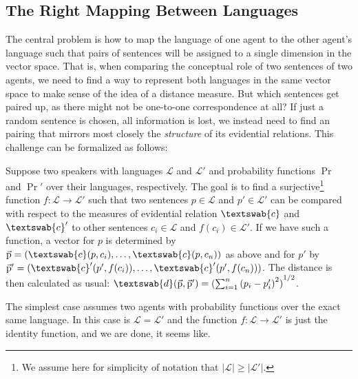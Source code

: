 \documentclass[11pt, a4paper]{scrartcl}
\renewcommand{\i}[1]{\emph{#1}}
\renewcommand{\L}{\mathcal{L}}
\renewcommand{\v}[1]{\vec{\mathrm{#1}}}
\newcommand{\m}[1]{\textswab{#1}}
\begin{document}
\subsection{The Right Mapping Between Languages}

The central problem is how to map the language of one agent to the other agent's language such that pairs of sentences will be assigned to a single dimension in the vector space. That is, when comparing the conceptual role of two sentences of two agents, we need to find a way to represent both languages in the same vector space to make sense of the idea of a distance measure. But which sentences get paired up, as there might not be one-to-one correspondence at all? If just a random sentence is chosen, all information is lost, we instead need to find an pairing that mirrors most closely the \i{structure} of its evidential relations. This challenge can be formalized as follows:

Suppose two speakers with languages $\L$ and $\L'$ and probability functions $\Pr$ and $\Pr'$ over their languages, respectively. The goal is to find a surjective\footnote{We assume here for simplicity of notation that $|\L| \geqslant |\L'|$.} function ${f: \L \rightarrow \L'}$ such that two sentences $p \in \L$ and $p' \in \L'$ can be compared with respect to the measures of evidential relation $\m{c}$ and $\m{c}'$ to other sentences $c_i \in \L$ and $f(c_i) \in \L'$. If we have such a function, a vector for $p$ is determined by $\v{p} = (\m{c}(p,c_i),\ldots,\m{c}(p,c_n))$ as above and for $p'$ by $\v{p}' = (\m{c}'(p',f(c_i)),\ldots,\m{c}'(p',f(c_n)))$. The distance is then calculated as usual: $\m{d}(\v{p},\v{p}')= {( \sum_{i=1}^n {(p_i-p_i')}^2 )}^{1/2}$.  

The simplest case assumes two agents with probability functions over the exact same language. In this case is $\L = \L'$ and the function $f: \L \rightarrow \L'$ is just the identity function, and we are done, it seems like.
\end{document}
